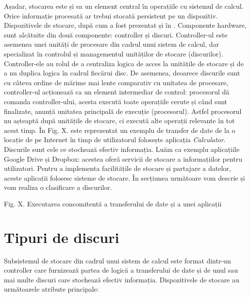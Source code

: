Așadar, stocarea este și ea un element central în operațiile cu sistemul de
calcul. Orice informație procesată ar trebui stocată persistent pe un
dispozitiv. Dispozitivele de stocare, după cum a fost prezentat și în
. Componente hardware, sunt alcătuite
din două componente: controller și discuri. Controller-ul este asemenea unei
unități de procesare din cadrul unui sistem de calcul, dar specializat în
controlul și managementul unităților de stocare (discurilor). Controller-ele au
rolul de a centraliza logica de acces la unitățile de stocare și de a nu duplica
logica în cadrul fiecărui disc. De asemenea, deoarece discurile sunt cu câteva
ordine de mărime mai lente comparativ cu unitatea de procesare, controller-ul
acționează ca un element intermediar de control: procesorul dă comanda
controller-ului, acesta execută toate operațiile cerute și când sunt finalizate,
anunță unitatea principală de execuție (procesorul). Astfel procesorul nu
așteaptă după unitățile de stocare, ci execută alte operații relevante în tot
acest timp. În Fig. X. este reprezentat un exemplu de transfer de date de la o
locație de pe Internet în timp de utilizatorul folosește aplicația
\textit{Calculator}. Discurile sunt cele ce stochează efectiv informația. Luăm
ca exemplu aplicațiile Google Drive și Dropbox: acestea oferă servicii de
stocare a informațiilor pentru utilizatori. Pentru a implementa facilitățile de
stocare și partajare a datelor, aceste aplicații folosesc sisteme de stocare. În
secțiunea următoare vom descrie și vom realiza o clasificare a discurilor.

Fig. X. Executarea concomitentă a transferului de date și a unei aplicații

\section{Tipuri de discuri}
\label{sec:storage-tipuri}

Subsistemul de stocare din cadrul unui sistem de calcul este format dintr-un
controller care furnizează partea de logică a transferului de date și de unul
sau mai multe discuri care stochează efectiv informația. Dispozitivele de
stocare au următoarele atribute principale:

